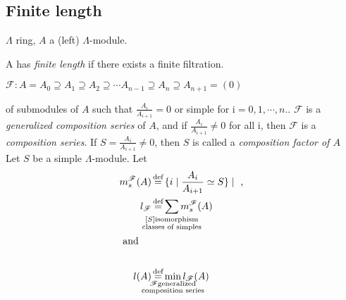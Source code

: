 \subsection{Finite length}
$\Lambda$ ring, $A$ a (left) $\Lambda$-module.
\begin{defin}
	A has \emph{finite length} if there exists a finite filtration.\\
	\begin{center}
			$\mathscr{F}\colon A = A_0 \supseteq A_1 \supseteq A_2 \supseteq \cdots A_{n-1} \supseteq A_{n} \supseteq A_{n+1} = (0) $\\
	\end{center}
of submodules of $A$ such that $\frac{A_i}{A_{i+1}} = 0$ or simple for i$=0,1,\cdots,n.$. 	$\mathscr{F}$ is a \emph{generalized composition series} of $A$, and if $\frac{A_i}{A_{i+1}} \ne 0$ for all i, then $\mathscr{F}$ is a \emph{composition series}. If $S=\frac{A_i}{A_{i+1}} \ne 0$, then $S$ is called a \emph{composition factor of $A$}\\

Let $S$ be a simple $\Lambda$-module. Let
\begin{align}
m_s^{\mathscr{F}}(A) & \defeq \{i \mid \frac{A_i}{A_{i+1}}\simeq S \}\mid \text{ , } \notag\\
l_{\mathscr{F}} & \defeq \sum_{\mathclap{\substack{\small[S]
      \text{isomorphism} \\ \small\text{classes of
        simples}}}}m_s^{\mathscr{F}}(A)\notag\\
\intertext{ and }\notag\\
l(A) & \defeq \min_{\mathclap{\substack{\mathscr{F} \text{generalized} \\ \text{composition series}}}} l_{\mathscr{F}}(A)\notag
\end{align}
\end{defin}


